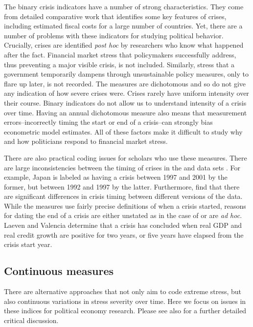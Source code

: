 \documentclass[]{article}
\begin{document}
The binary crisis indicators have a number of strong characteristics. They come from detailed comparative work that identifies some key features of crises, including estimated fiscal costs for a large number of countries. Yet, there are a number of problems with these indicators for studying political behavior. Crucially, crises are identified \emph{post hoc} by researchers who know what happened after the fact. Financial market stress that policymakers successfully address, thus preventing a major visible crisis, is not included. Similarly, stress that a government temporarily dampens through unsustainable policy measures, only to flare up later, is not recorded. The measures are dichotomous and so do not give any indication of how severe crises were. Crises rarely have uniform intensity over their course. Binary indicators do not allow us to understand intensity of a crisis over time.  Having an annual dichotomous measure also means that measurement errors--incorrectly timing the start or end of a crisis--can strongly bias econometric model estimates. All of these factors make it difficult to study why and how politicians respond to financial market stress.

There are also practical coding issues for scholars who use these measures. There are large inconsistencies between the timing of crises in the \cite{laeven2013} and \cite{Reinhart2009} data sets \citep{Chaudron2014}. For example, Japan is labeled as having a crisis between 1997 and 2001 by the former, but between 1992 and 1997 by the latter. Furthermore, \cite{GandrudHallerberg2015} find that there are significant differences in crisis timing between different versions of the \cite{laeven2013} data. While the measures use fairly precise definitions of when a crisis started, reasons for dating the end of a crisis are either unstated as in the case of \cite{Reinhart2009} or are \emph{ad hoc}. Laeven and Valencia \citeyearpar[footnote 19]{laeven2013} determine that a crisis has concluded when real GDP and real credit growth are positive for two years, or five years have elapsed from the crisis start year.

\subsection{Continuous measures}

There are alternative approaches that not only aim to code extreme stress, but also continuous variations in stress severity over time. Here we focus on issues in these indices for political economy research. Please see also \cite{Kliesen2012} for a further detailed critical discussion.
\end{document}
